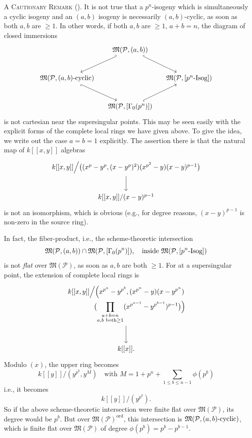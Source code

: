 \par{}\noindent
{\scshape A Cautionary Remark} (\thekmitem).\label{item:13.4.8}\enspace\ignorespaces
It is not true that a $p^n$-isogeny which is simultaneously a cyclic isogeny and an $(a,b)$ isogeny is necessarily $(a,b)$-cyclic, as soon as both $a, b$ are $\ge 1$. In other words, if both $a, b$ are $\ge 1$, $a + b = n$, the diagram of closed immersions
\[
\begin{tikzcd}[row sep=2.4em, column sep=1.2em]
& \mathfrak{M}(\mathcal{P}, (a,b)) \arrow[ld, hook'] \arrow[rd, hook] & \\
\mathfrak{M}(\mathcal{P}, (a,b)\text{-\rm cyclic}) \arrow[rd, hook'] & & \mathfrak{M}(\mathcal{P}, [p^n\text{-\rm Isog}]) \\
& \mathfrak{M}(\mathcal{P}, [\Gamma_0(p^n)]) \arrow[ru, hook'] &
\end{tikzcd}
\]
is not cartesian near the supersingular points. This may be seen easily with the explicit forms of the complete local rings we have given above. To give the idea, we write out the case $a = b = 1$ explicitly. The assertion there is that the natural map of $k[[x,y]]$ algebras
\[
\begin{tikzcd}[row sep=2.2em]
k[[x, y]] \Big/ \bigl( (x^p - y^p, (x - y^p)^2)(x^{p^2} - y)(x - y)^{p-1} \bigr) \arrow[d] \\
k[[x, y]]/(x - y)^{p-1}
\end{tikzcd}
\]
is not an isomorphism, which is obvious (e.g., for degree reasons, $(x-y)^{p-1}$ is non-zero in the source ring).

In fact, the fiber-product, i.e., the scheme-theoretic intersection
\[
\mathfrak{M}(\mathcal{P}, (a,b)) \cap \mathfrak{M}(\mathcal{P}, [\Gamma_0(p^n)]) , \quad \text{inside } \mathfrak{M}(\mathcal{P}, [p^n\text{-\rm Isog}])
\]
is not \emph{flat} over $\mathfrak{M}(\mathcal{P})$, as soon as $a, b$ are both $\ge 1$. For at a supersingular point, the extension of complete local rings is
\[
\begin{tikzcd}[row sep=2.6em]
\begin{gathered}
k[[x, y]] \Big/ \Bigl( x^{p^a} - y^{p^b}, (x^{p^n} - y)(x - y^{p^n}) \\
\qquad\qquad \bigl( \prod_{\substack{a+b=n \\ a, b \text{ both} \ge 1}} (x^{p^{a-1}} - y^{p^{b-1}})^{p-1} \bigr) \Bigr)
\end{gathered} \arrow[d] \\
k[[x]] .
\end{tikzcd}
\]
Modulo $(x)$, the upper ring becomes
\[
k[[y]]/(y^{p^b}, y^M) \quad\text{with } M = 1 + p^n + \sum_{1 \le b \le n-1} \phi(p^b)
\]
i.e., it becomes
\[
k[[y]]/(y^{p^b}) .
\]
So if the above scheme-theoretic intersection were finite flat over $\mathfrak{M}(\mathcal{P})$, its degree would be $p^b$. But over $\mathfrak{M}(\mathcal{P})^{\mathrm{ord}}$, this intersection is $\mathfrak{M}(\mathcal{P}, (a,b)\text{-\rm cyclic})$, which is finite flat over $\mathfrak{M}(\mathcal{P})$ of degree $\phi(p^b) = p^b - p^{b-1}$.

